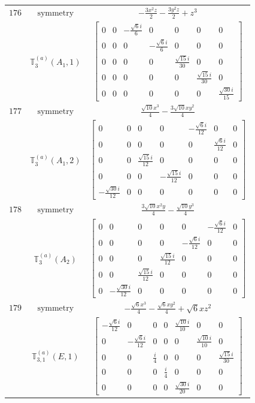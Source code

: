 \documentclass[fleqn,8pt,landscape]{jsarticle}
\begin{document}
\begin{longtable}{ccc}
$ 176 $ & $ \text{symmetry} $ & $ - \frac{3 x^{2} z}{2} - \frac{3 y^{2} z}{2} + z^{3} $ \\
$  $ & $ \mathbb{T}_{3}^{(a)}(A_{1},1) $ & $ \begin{bmatrix} 0 & 0 & - \frac{\sqrt{6} i}{6} & 0 & 0 & 0 & 0 \\ 0 & 0 & 0 & - \frac{\sqrt{6} i}{6} & 0 & 0 & 0 \\ 0 & 0 & 0 & 0 & \frac{\sqrt{15} i}{30} & 0 & 0 \\ 0 & 0 & 0 & 0 & 0 & \frac{\sqrt{15} i}{30} & 0 \\ 0 & 0 & 0 & 0 & 0 & 0 & \frac{\sqrt{30} i}{15} \end{bmatrix} $ \\ \hline
$ 177 $ & $ \text{symmetry} $ & $ \frac{\sqrt{10} x^{3}}{4} - \frac{3 \sqrt{10} x y^{2}}{4} $ \\
$  $ & $ \mathbb{T}_{3}^{(a)}(A_{1},2) $ & $ \begin{bmatrix} 0 & 0 & 0 & 0 & - \frac{\sqrt{6} i}{12} & 0 & 0 \\ 0 & 0 & 0 & 0 & 0 & \frac{\sqrt{6} i}{12} & 0 \\ 0 & 0 & \frac{\sqrt{15} i}{12} & 0 & 0 & 0 & 0 \\ 0 & 0 & 0 & - \frac{\sqrt{15} i}{12} & 0 & 0 & 0 \\ - \frac{\sqrt{30} i}{12} & 0 & 0 & 0 & 0 & 0 & 0 \end{bmatrix} $ \\ \hline
$ 178 $ & $ \text{symmetry} $ & $ \frac{3 \sqrt{10} x^{2} y}{4} - \frac{\sqrt{10} y^{3}}{4} $ \\
$  $ & $ \mathbb{T}_{3}^{(a)}(A_{2}) $ & $ \begin{bmatrix} 0 & 0 & 0 & 0 & 0 & - \frac{\sqrt{6} i}{12} & 0 \\ 0 & 0 & 0 & 0 & - \frac{\sqrt{6} i}{12} & 0 & 0 \\ 0 & 0 & 0 & \frac{\sqrt{15} i}{12} & 0 & 0 & 0 \\ 0 & 0 & \frac{\sqrt{15} i}{12} & 0 & 0 & 0 & 0 \\ 0 & - \frac{\sqrt{30} i}{12} & 0 & 0 & 0 & 0 & 0 \end{bmatrix} $ \\ \hline
$ 179 $ & $ \text{symmetry} $ & $ - \frac{\sqrt{6} x^{3}}{4} - \frac{\sqrt{6} x y^{2}}{4} + \sqrt{6} x z^{2} $ \\
$  $ & $ \mathbb{T}_{3,1}^{(a)}(E,1) $ & $ \begin{bmatrix} - \frac{\sqrt{6} i}{12} & 0 & 0 & 0 & \frac{\sqrt{10} i}{10} & 0 & 0 \\ 0 & - \frac{\sqrt{6} i}{12} & 0 & 0 & 0 & \frac{\sqrt{10} i}{10} & 0 \\ 0 & 0 & \frac{i}{4} & 0 & 0 & 0 & \frac{\sqrt{15} i}{30} \\ 0 & 0 & 0 & \frac{i}{4} & 0 & 0 & 0 \\ 0 & 0 & 0 & 0 & \frac{\sqrt{30} i}{20} & 0 & 0 \end{bmatrix} $ \\ \hline

\end{longtable}
\end{document}
